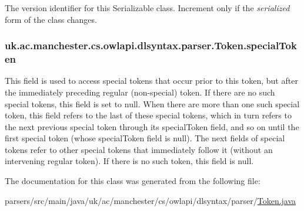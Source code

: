 The version identifier for this Serializable class. Increment only if the {\itshape serialized} form of the class changes. \hypertarget{classuk_1_1ac_1_1manchester_1_1cs_1_1owlapi_1_1dlsyntax_1_1parser_1_1_token_a31f691d9f57e399b5ed0eb808cf3cfa6}{
\subsubsection[{special\-Token}]{ uk.\-ac.\-manchester.\-cs.\-owlapi.\-dlsyntax.\-parser.\-Token.\-special\-Token}}\label{classuk_1_1ac_1_1manchester_1_1cs_1_1owlapi_1_1dlsyntax_1_1parser_1_1_token_a31f691d9f57e399b5ed0eb808cf3cfa6}
This field is used to access special tokens that occur prior to this token, but after the immediately preceding regular (non-\/special) token. If there are no such special tokens, this field is set to null. When there are more than one such special token, this field refers to the last of these special tokens, which in turn refers to the next previous special token through its special\-Token field, and so on until the first special token (whose special\-Token field is null). The next fields of special tokens refer to other special tokens that immediately follow it (without an intervening regular token). If there is no such token, this field is null. 

The documentation for this class was generated from the following file\-:\begin{DoxyCompactItemize}
\item 
parsers/src/main/java/uk/ac/manchester/cs/owlapi/dlsyntax/parser/\hyperlink{uk_2ac_2manchester_2cs_2owlapi_2dlsyntax_2parser_2_token_8java}{Token.\-java}\end{DoxyCompactItemize}
